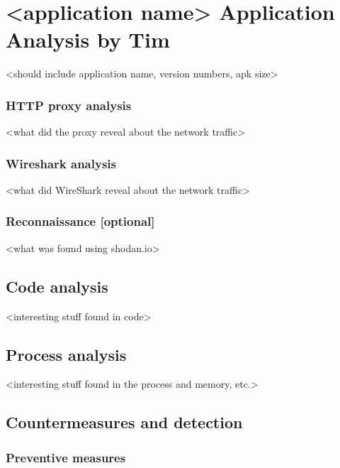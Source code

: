 \section{<application name> Application Analysis by Tim}

<should include application name, version numbers, apk size>









\subsubsection{HTTP proxy analysis}

<what did the proxy reveal about the network traffic>

\subsubsection{Wireshark analysis}

<what did WireShark reveal about the network traffic>

\subsubsection{Reconnaissance [optional]}

<what was found using shodan.io>

\newpage
\subsection{Code analysis}

<interesting stuff found in code>

\newpage
\subsection{Process analysis}

<interesting stuff found in the process and memory, etc.>

\newpage
\subsection{Countermeasures and detection}

\subsubsection{Preventive measures}


